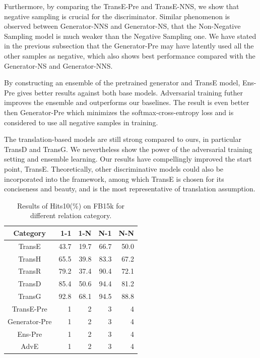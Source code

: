 \documentclass[twocolumn,a4paper,10pt,preprint,3p]{elsarticle}
\begin{document}
Furthermore, by comparing the TransE-Pre and TransE-NNS, we show that negative sampling is crucial for the discriminator. Similar phenomenon is observed between Generator-NNS and Generator-NS, that the Non-Negative Sampling model is much weaker than the Negative Sampling one. We have stated in the previous subsection that the Generator-Pre may have latently used all the other samples as negative, which also shows best performance compared with the Generator-NS and {Generator-NNS}.

By constructing an ensemble of the pretrained generator and TransE model, Ens-Pre gives better results against both base models. Adversarial training futher improves the ensemble and outperforms our baselines. The result is even better then Generator-Pre which minimizes the softmax-cross-entropy loss and is considered to use all negative samples in training.

The translation-based models are still strong compared to ours, in particular TransD and TransG. We nevertheless show the power of the adversarial training setting and ensemble learning. Our results have compellingly improved the start point, TransE. Theoretically, other discriminative models could also be incorporated into the framework, among which TransE is chosen for its conciseness and beauty, and is the most representative of translation assumption.

\begin{table}[htbp]
    \centering
    \begin{tabular}{c|r|r|r|r}
        \toprule
        \textbf{Category} & \textbf{1-1} & \textbf{1-N} & \textbf{N-1} & \textbf{N-N} \\
        \midrule
        TransE & 43.7 & 19.7 & 66.7 & 50.0 \\
        TransH & 65.5 & 39.8 & 83.3 & 67.2 \\
        TransR & 79.2 & 37.4 & 90.4 & 72.1 \\
        TransD & 85.4 & 50.6 & 94.4 & 81.2 \\
        TransG & 92.8 & 68.1 & 94.5 & 88.8 \\
        \midrule
        TransE-Pre & 1 & 2 & 3 & 4 \\        
        Generator-Pre & 1 & 2 & 3 & 4 \\
        \midrule
        Ens-Pre & 1 & 2 & 3 & 4 \\
        AdvE & 1 & 2 & 3 & 4 \\
        \bottomrule
    \end{tabular}
    \caption{Results of Hits\@10(\%) on FB15k for different relation category.}
\label{tab:rel-cate-results}
\end{table}
\end{document}
